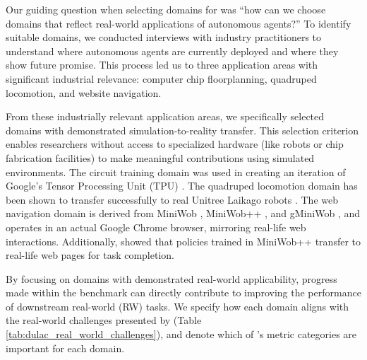 

Our guiding question when selecting domains for \method was ``how can we choose domains that reflect real-world applications of autonomous agents?''
To identify suitable domains, we conducted interviews with industry practitioners to understand where autonomous agents are currently deployed and where they show future promise.
This process led us to three application areas with significant industrial relevance: computer chip floorplanning, quadruped locomotion, and website navigation.

From these industrially relevant application areas, we specifically selected domains with demonstrated simulation-to-reality transfer. This selection criterion enables researchers without access to specialized hardware (like robots or chip fabrication facilities) to make meaningful contributions using simulated environments. The circuit training domain was used in creating an iteration of Google's Tensor Processing Unit (TPU) \citep{mirhoseini2021graph}. The quadruped locomotion domain has been shown to transfer successfully to real Unitree Laikago robots \citep{peng2020learning_agile_imitate}. 
The web navigation domain is derived from MiniWob \citep{shi2017world}, MiniWob++ \citep{liu2018reinforcement}, and gMiniWob \citep{gur2021environment}, and operates in an actual Google Chrome browser, mirroring real-life web interactions. Additionally, \cite{gur2018learning_to_navigate_the_web} showed that policies trained in MiniWob++ transfer to real-life web pages for task completion.

By focusing on domains with demonstrated real-world applicability, progress made within the \method benchmark can directly contribute to improving the performance of downstream real-world (RW) tasks.
We specify how each domain aligns with the real-world challenges presented by \citet{dulac2021challenges} (Table \ref{tab:dulac_real_world_challenges}), and denote which of \method's metric categories are important for each domain.


